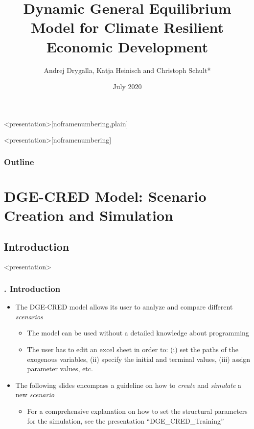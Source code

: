 \documentclass[11pt,aspectratio=169]{beamer}
\title[DGE--CRED]{Dynamic General Equilibrium Model for Climate Resilient Economic Development}
\author[Christoph Schult]{Andrej Drygalla, Katja Heinisch and Christoph Schult*} \date[July 2020]{July 2020}
\institute[IWH]{Halle Institute for Economic Research}
\begin{document}
{}

\begin{frame}<presentation>[noframenumbering,plain]
  \titlepage \\
	{\tiny} 
\end{frame}
\usebackgroundtemplate{
}
{
\begin{frame}<presentation>[noframenumbering]
	\frametitle{Outline}
		 \tableofcontents[hideallsubsections]
\end{frame}
}

\section{DGE-CRED Model: Scenario Creation and Simulation}

\subsection{Introduction}

\begin{frame}<presentation>
\frametitle{{\thesection.\thesubsection} Introduction}
	\begin{itemize}
		\item The DGE-CRED model allows its user to analyze and compare different \textit{scenarios}
		\begin{itemize}
			\item The model can be used without a detailed knowledge about programming 
			\item The user has to edit an excel sheet in order to: (i) set the paths of the exogenous variables, (ii) specify the initial and terminal values, (iii) assign parameter values, etc.
		\end{itemize}
		\item The following slides encompass a guideline on how to \textit{create} and \textit{simulate} a new \textit{scenario} 
		\begin{itemize}
			\item For a comprehensive explanation on how to set the structural parameters for the simulation, see the presentation ``DGE\_CRED\_Training''
		\end{itemize}
	\end{itemize}
\end{frame}
\end{document}
